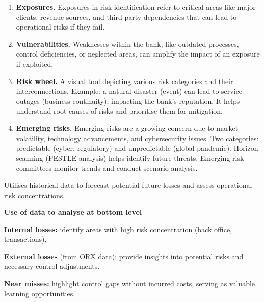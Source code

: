 \begin{enumerate}
\item[\textcolor{rust}{\sffamily\bfseries 1)}] \textbf{Exposures.} Exposures in
risk identification refer to critical areas like major clients, revenue sources,
and third-party dependencies that can lead to operational risks if they fail.
\item[\textcolor{rust}{\sffamily\bfseries 2)}] \textbf{Vulnerabilities.}
Weaknesses within the bank, like outdated processes, control deficiencies, or
neglected areas, can amplify the impact of an exposure if exploited.
\item[\textcolor{rust}{\sffamily\bfseries 3)}] \textbf{Risk wheel.} A visual tool
depicting various risk categories and their interconnections. Example: a natural
disaster (event) can lead to service outages (business continuity), impacting the
bank's reputation. It helps understand root causes of risks and prioritise them
for mitigation.
\item[\textcolor{rust}{\sffamily\bfseries 4)}] \textbf{Emerging risks.} Emerging
risks are a growing concern due to market volatility, technology advancements,
and cybersecurity issues. Two categories: predictable (cyber, regulatory) and
unpredictable (global pandemic). Horizon scanning (PESTLE analysis) helps
identify future threats. Emerging risk committees monitor trends and conduct
scenario analysis.
\end{enumerate}



Utilises historical data to forecast potential future losses and assess
operational risk concentrations.

\begin{orkeybox}
{\sffamily\bfseries\fontsize{8.6}{10}\selectfont\color{navy}Use of data to
analyse at bottom level}\par
\vspace{4pt}
\begin{lettered}
\item \textbf{Internal losses:} identify areas with high risk concentration
(back office, transactions).
\item \textbf{External losses} (from ORX data): provide insights into potential
risks and necessary control adjustments.
\item \textbf{Near misses:} highlight control gaps without incurred costs,
serving as valuable learning opportunities.
\end{lettered}
\end{orkeybox}

